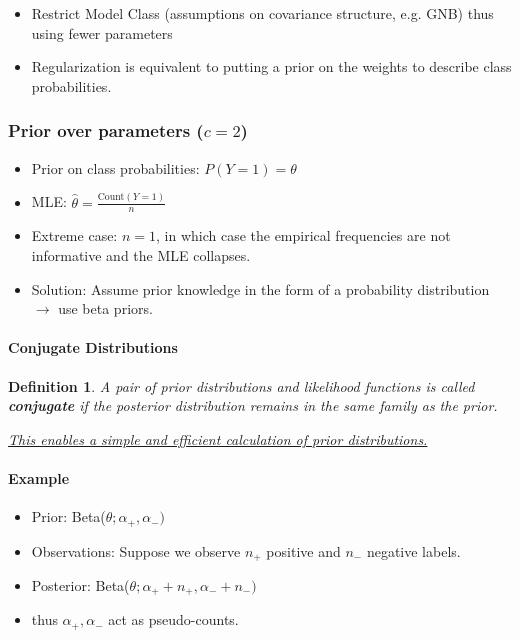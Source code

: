 \documentclass[8pt,a4paper]{scrartcl}
\newtheorem{define}{Definition}
\begin{document}
\begin{multicols*}{3}
\begin{itemize}
\ncompaq
\item Restrict Model Class (assumptions on covariance structure, e.g. GNB) thus using fewer parameters
\item Regularization is equivalent to putting a prior on the weights to describe class probabilities.
\end{itemize}

\subsubsection{Prior over parameters ($c=2$)}

\begin{itemize}
\ncompaq
\item Prior on class probabilities: $P(Y=1)=\theta$
\item MLE: $\hat{\theta}=\frac{\text{Count}(Y=1)}{n}$
\item Extreme case: $n=1$, in which case the empirical frequencies are not informative and the MLE collapses.
\item Solution: Assume prior knowledge in the form of a probability distribution $\rightarrow$ use beta priors.
\end{itemize}

\paragraph{Conjugate Distributions}

\begin{define}
A pair of prior distributions and likelihood functions is called \textbf{conjugate} if the posterior distribution remains in the same family as the prior.

\underline{This enables a simple and efficient calculation of prior distributions.}
\end{define}

\paragraph{Example}

\begin{itemize}
\ncompaq
\item Prior: Beta($\theta;\alpha_+,\alpha_-)$
\item Observations: Suppose we observe $n_+$ positive and $n_-$ negative labels.
\item Posterior: Beta($\theta;\alpha_++n_+,\alpha_-+n_-)$
\item thus $\alpha_+,\alpha_-$ act as pseudo-counts.
\end{itemize}


\end{multicols*}
\end{document}
